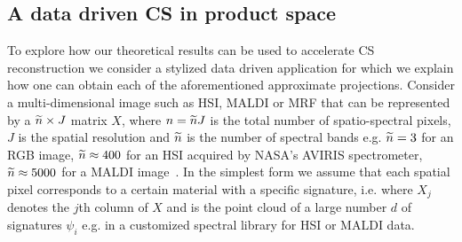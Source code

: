  

\subsection{A data driven CS in product space}
To explore how our theoretical results can be used to accelerate CS reconstruction we consider a stylized data driven application for which we explain how one can obtain each of the aforementioned approximate projections. Consider a multi-dimensional image such as HSI, MALDI or MRF that can be represented by a $\widetilde n\times J$ matrix $X$, where $n=\widetilde n J$ is the total number of spatio-spectral pixels, $J$ is the spatial resolution and $\widetilde n$ is the number of spectral bands 
e.g. $\widetilde n=3$ for an RGB image, $\widetilde n\approx 400$ for an HSI acquired by NASA's AVIRIS spectrometer, $\widetilde n\approx 5000$ for a MALDI image~\cite{Kobarg2014}.
 In the simplest form we assume that 
each spatial pixel corresponds to a certain material with a specific signature, i.e. 
where $X_j$ denotes the $j$th column of $X$ and 
is the point cloud of a large number $d$ of signatures $\psi_i$ e.g. in a customized spectral library for HSI or MALDI data.


